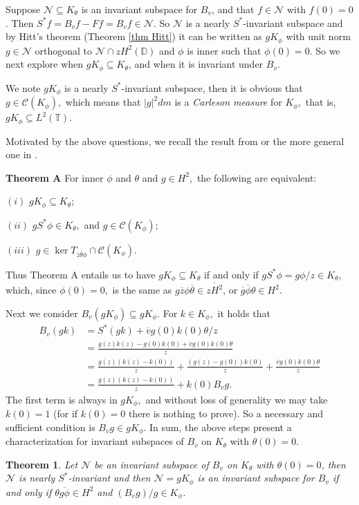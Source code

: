 \documentclass[12pt,reqno]{amsart}
\newtheorem{thm}{Theorem}[section]
\theoremstyle{definition}
\theoremstyle{remark}
\numberwithin{equation}{section}
\newcommand{\ol}{\overline}
\newcommand{\ma}{\mathcal}
\begin{document}
 Suppose $\ma{N}\subseteq K_\theta$ is an invariant subspace for $B_v$, and that $f\in \ma{N}$ with $f(0)=0$.
Then $S^*f=B_vf-F f=B_vf\in \ma{N}.$ So $\ma{N}$ is a nearly $S^*$-invariant subspace and by Hitt's theorem (Theorem \ref{thm Hitt}) it can be written as $gK_\phi$ with unit norm $g\in \ma{N}$   orthogonal to $\ma{N}\cap zH^2(\mathbb{D})$ and $\phi$ is inner such that $\phi(0)=0.$
So we next  explore when $gK_\phi\subseteq K_\theta$, and when it is invariant under $B_v$.

We note $gK_\phi$ is a nearly $S^*$-invariant subspace, then it is obvious
that $g\in \ma{C}(K_\phi),$ which means that $|g|^2dm$ is a {\em Carleson measure\/} for $K_\phi,$ that is, $g K_\phi\subseteq L^2(\mathbb{T}).$

Motivated by the above questions, we recall  the result  from \cite{FHR} or the more general one in \cite{CaP3}.\vspace{1mm}

\textbf{Theorem A }\cite[Theorem 3.1]{FHR} For inner $\phi$ and $\theta$ and $g\in H^2,$  the following are equivalent:

$(i)$  $gK_\phi\subseteq K_\theta$;

$(ii)$ $g S^*\phi\in  K_\theta,$ and $g\in \mathcal{C}(K_\phi);$

$(iii)$ $g\in \ker T_{\ol{z}\ol{\theta}\phi }\cap\mathcal{C}(K_\phi).$
\vspace{1mm}

Thus Theorem A entails us to have $gK_\phi\subseteq K_\theta$ if and only if $gS^*\phi=g \phi/z\in K_\theta,$ which, since $\phi(0)=0,$ is the same as $g\ol{z}\phi \ol{\theta}\in \ol{zH^2}$, or $\ol{g}\ol{\phi}\theta \in H^2.$

Next we consider $B_v(gK_\phi)\subseteq gK_\phi$. For $k\in K_\phi,$ it holds that
\begin{align*}
B_v(gk)&=S^*(gk)+\ol{v}g(0)k(0)\theta/z\\&=\frac{g(z)k(z)-g(0)k(0)+ \ol{v}g(0)k(0)\theta}{z} \\&
=\frac{g(z)(k(z)-k(0))}{z}+\frac{(g(z)-g(0))k(0)}{z}+\frac{ \ol{v}g(0)k(0)\theta}{z}
\\&=\frac{g(z)(k(z)-k(0))}{z}+k(0)B_vg.
\end{align*}
The first term is always in $gK_\phi,$ and without loss of generality we may take
$k(0)=1$ (for if $k(0)= 0$ there is nothing to prove). So a necessary and
sufficient condition is $B_vg \in gK_\phi. $ In sum, the above steps present  a characterization for invariant subspaces of $B_v$ on $K_\theta$ with $\theta(0)=0.$
\begin{thm}\label{thmiS} Let $\ma{N}$ be an invariant subspace of  $B_v$   on $K_\theta$ with $\theta(0)=0$, then $\ma{N}$ is nearly $S^*$-invariant and then $\ma{N}=gK_\phi$ is an invariant subspace for $B_v$ if and only if $\theta \ol{g\phi}\in H^2$ and $(B_vg)/g \in K_\phi$.\end{thm}
\end{document}
